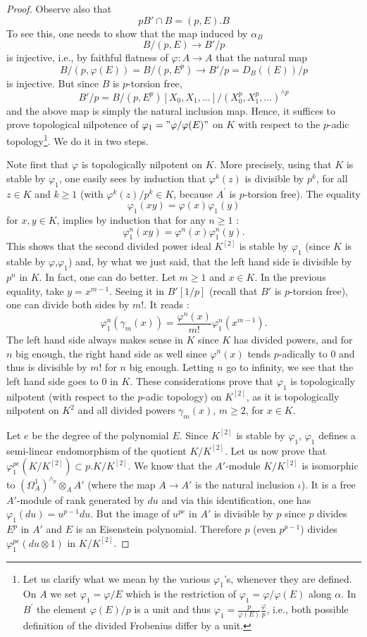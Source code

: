 \documentclass{amsart}
\theoremstyle{plain}
\theoremstyle{definition}
\newcommand{\red}[1]{{\color{black} #1}}
\begin{document}
\begin{proof}
Observe also that
\[ pB' \cap B = (p,E).B \]
To see this, one needs to show that the map induced by $\alpha_B$ 
\[ B/(p,E) \to B'/p \]
is injective, i.e., by faithful flatness of $\varphi\colon A\to A$ that the natural map
\[ B/(p,\varphi(E))=B/(p,E^p) \to B'/p=D_{B}((E))/p \] 
is injective. But since $B$ is $p$-torsion free, 
\[ B'/p = B/(p,E^p)[X_0,X_1,\dots]/(X_0^p,X_1^p,\dots)^{\wedge p}\]
and the above map is simply the natural inclusion map. Hence, it suffices to prove topological nilpotence of $\varphi_1="\varphi/\varphi(E)"$ on $K$ with respect to the $p$-adic topology\footnote{Let us clarify what we mean by the various $\varphi_1$'s, whenever they are defined. On $A$ we set $\varphi_1=\varphi/E$ which is the restriction of $\varphi_1=\varphi/\varphi(E)$ along $\alpha$. In $B^\prime$ the element $\varphi(E)/p$ is a unit and thus $\varphi_1=\frac{p}{\varphi(E)}\frac{\varphi}{p}$, i.e., both possible definition of the divided Frobenius differ by a unit.}. We do it in two steps.

Note first that $\varphi$ is topologically nilpotent on $K$. More precisely, using that $K$ is stable by $\varphi_1$, one easily sees by induction that $\varphi^k(z)$ is divisible by $p^k$, for all $z \in K$ and $k\geq 1$ (with $\varphi^k(z)/p^k\in K$, because $A^\prime$ is $p$-torsion free). The equality
\[ \varphi_1(xy)=\varphi(x) \varphi_1(y) \]
for $x, y \in K$, implies by induction that for any $n \geq 1$ :  
\[ \varphi_1^n(xy)=\varphi^n(x) \varphi_1^n(y). \]
This shows that the second divided power ideal $K^{[2]}$ is stable by $\varphi_1$ (since $K$ is stable by $\varphi$,$\varphi_1$) and, by what we just said, that the left hand side is divisible by $p^n$ in $K$. In fact, one can do better. Let $m \geq 1$ and $x \in K$. In the previous equality, take $y=x^{m-1}$. Seeing it in $B'[1/p]$ (recall that $B'$ is $p$-torsion free), one can divide both sides by $m!$. It reads :
\[ \varphi_1^n(\gamma_m(x))= \frac{\varphi^n(x)}{m!} \varphi_1^n(x^{m-1}). \]
The left hand side always makes sense in $K$ since $K$ has divided powers, and for $n$ big enough, the right hand side as well since $\varphi^n(x)$ tends $p$-adically to $0$ and thus is divisible by $m!$ for $n$ big enough. Letting $n$ go to infinity, we see that the left hand side goes to $0$ in $K$. These considerations prove that $\varphi_1$ is topologically nilpotent (with respect to the $p$-adic topology) on $K^{[2]}$, as it is topologically nilpotent on $K^2$ and all divided powers $\gamma_m(x)$, $m\geq 2$, for $x\in K$. 

Let $e$ be the degree of the polynomial $E$. Since $K^{[2]}$ is stable by $\varphi_1$, $\varphi_1$ defines a semi-linear endomorphism of the quotient $K/K^{[2]}$. Let us now prove that $\varphi_1^{pe}(K/K^{[2]}) \subset p. K/K^{[2]}$. We know that the $A'$-module $K/K^{[2]}$ is isomorphic to $(\Omega_A^{1})^{\wedge_p} \otimes_A A'$ (where the map $A \to A'$ is the natural inclusion \red{$\iota$}). It is a free $A'$-module of rank generated by $du$ and via this identification, one has $\varphi_1(du)= u^{p-1} du$. But the image of $u^{pe}$ in $A'$ is divisible by $p$ since $p$ divides $E^p$ in $A'$ and $E$ is an Eisenstein polynomial. Therefore $p$ (even $p^{p-1}$) divides $\varphi^{pe}_{1}(du \otimes 1)$ in $K/K^{[2]}$.        


\end{proof}
\end{document}
